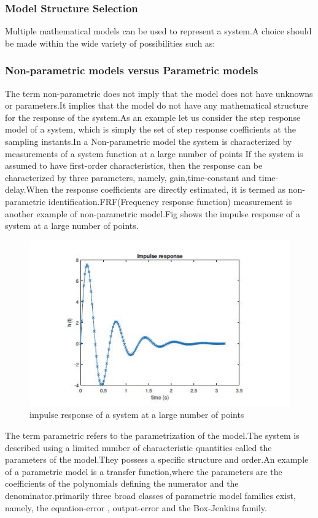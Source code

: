 \documentclass[a4paper,12pt]{article}
\numberwithin{equation}{section}
\begin{document}
\subsubsection{Model Structure Selection}
Multiple mathematical models can be used to represent a system.A choice should be made within the wide variety of possibilities such as:

\subsubsection*{ Non-parametric models versus Parametric models }
The term non-parametric does not imply that the model does not have unknowns or parameters.It implies that the model do not have any mathematical structure for the response of the system.As an example let us consider the step response model of a system, which is simply the set of step response coefficients at the sampling instants.In a Non-parametric model the system is characterized by measurements of a system function at a large number of points If the system is assumed to have first-order characteristics, then the response can be characterized by three parameters, namely, gain,time-constant and time-delay.When the response coefficients are directly estimated, it is termed as non-parametric identification.FRF(Frequency response function) measurement is another example of non-parametric model.Fig shows the impulse response of a system at a large number of points.

\begin{figure}[H]
    \includegraphics[scale=1]{impulse_response.JPG}
    \centering
    \caption{impulse response of a system at a large number of points}
    \label{fig:imp_res}
\end{figure}


The term parametric refers to the parametrization of the model.The system is described using a limited number of characteristic quantities called the parameters of the model.They possess a  specific structure and order.An example of a parametric model is a transfer function,where the parameters are the coefficients of the polynomials defining the numerator and the denominator.primarily three broad classes of parametric model families exist,
namely, the equation-error , output-error and the Box-Jenkins family.
\end{document}
